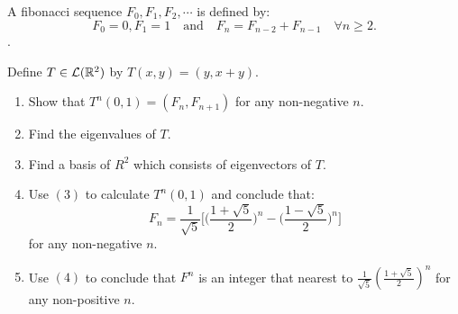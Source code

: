 \documentclass[../main.tex]{subfiles}
\begin{document}
\begin{exercise}
  A fibonacci sequence $F_0, F_1, F_2, \cdots$ is defined by:
  \[
  F_0 = 0, F_1 = 1 \quad \text{and} \quad F_n = F_{n - 2} + F_{n - 1} \quad \forall n \ge 2.
  \].

  Define $T \in \mathcal{L}(\mathbb{R}^2)$ by $T(x, y) = (y, x + y)$.
  \begin{enumerate}
    \item Show that $T^n(0, 1) = (F_n, F_{n + 1})$ for any non-negative $n$.
    \item Find the eigenvalues of $T$.
    \item Find a basis of $R^2$ which consists of eigenvectors of $T$.
    \item Use $(3)$ to calculate $T^n(0, 1)$ and conclude that:
          \[
          F_n = \frac{1}{\sqrt{5}}\Big[ \Big(\frac{1 + \sqrt{5}}{2}\Big)^n - \Big(\frac{1 - \sqrt{5}}{2}\Big)^n \Big]
          \]
          for any non-negative $n$.
    \item Use $(4)$ to conclude that $F^n$ is an integer that nearest to $\frac{1}{\sqrt{5}}(\frac{1 + \sqrt{5}}{2})^n$
          for any non-positive $n$.
  \end{enumerate}
\end{exercise}
\end{document}
